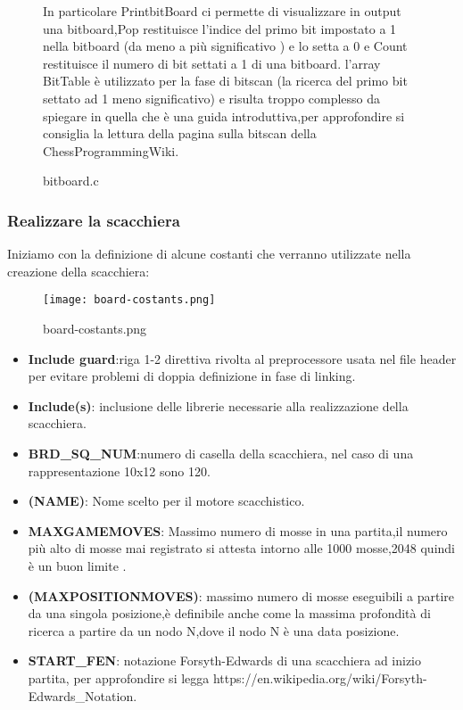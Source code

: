 \begin{figure}[H]
    \begin{minipage}[t]{.63\textwidth}
        \centering {}
        \caption{bitboard.c}
        \label{fig:bitboard.c}
    \end{minipage}
    \begin{minipage}[t]{0.35\textwidth}
        {In particolare PrintbitBoard ci permette di visualizzare in output una bitboard,Pop restituisce l'indice del primo bit impostato a 1 nella bitboard
            (da meno a più significativo ) e  lo setta a 0 e Count restituisce il numero di bit settati a 1 di una bitboard.
            l'array BitTable è utilizzato per la fase di bitscan (la ricerca del primo bit settato ad 1 meno significativo)
            e risulta troppo complesso da spiegare in quella che è una guida introduttiva,per approfondire si consiglia
            la lettura della pagina sulla bitscan della ChessProgrammingWiki.
        }

    \end{minipage}
\end{figure}



\subsubsection{Realizzare la scacchiera}
Iniziamo con la definizione di alcune costanti che verranno utilizzate nella creazione della scacchiera:
\begin{figure}[!ht]
    \texttt{[image: board-costants.png]}
    \caption{ board-costants.png}
\end{figure}

\begin{itemize}
    \item \textbf{Include guard}:riga 1-2 direttiva rivolta al preprocessore usata nel file header per evitare problemi
          di doppia definizione in fase di linking.
    \item \textbf{Include(s)}: inclusione delle librerie necessarie alla realizzazione della scacchiera.
    \item \textbf{BRD\_SQ\_NUM}:numero di casella della scacchiera, nel caso di una rappresentazione 10x12 sono 120.
    \item \textbf{(NAME)}: Nome scelto per il motore scacchistico.
    \item \textbf{MAXGAMEMOVES}: Massimo numero di mosse in una partita,il numero più alto di mosse mai registrato si attesta intorno alle
          1000 mosse,2048 quindi è un buon limite .
    \item \textbf{(MAXPOSITIONMOVES)}: massimo numero di mosse eseguibili a partire da una singola posizione,è definibile anche come
          la massima profondità di ricerca a partire da un nodo N,dove il nodo N è una data posizione.
    \item \textbf{START\_FEN}: notazione Forsyth-Edwards di una scacchiera ad inizio partita,
          per approfondire si legga https://en.wikipedia.org/wiki/Forsyth-Edwards\_Notation.
\end{itemize}

